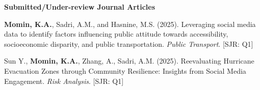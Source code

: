 \documentclass[a4paper,11pt]{article}
\begin{document}
\vspace{-4mm}
\textcolor{mycolor}{\textbf{Submitted/Under-review Journal Articles}}
\begin{enumerate}[leftmargin=*, labelsep=0em, align=left, widest={[\textbf{S.10}]}, itemindent=0em, label={\textbf{[S.\arabic*]}}]

\begin{justifying}

\item \textbf{Momin, K.A.}, Sadri, A.M., and Hasnine, M.S. (2025). Leveraging social media data to identify factors influencing public attitude towards accessibility, socioeconomic disparity, and public transportation. \textit{Public Transport}. \hfill [\textcolor{mycolor}{SJR: Q1}]

\item Sun Y., \textbf{Momin, K.A.}, Zhang, A., Sadri, A.M. (2025). Reevaluating Hurricane Evacuation Zones through Community Resilience: Insights from Social Media Engagement. \textit{Risk Analysis}. \hfill [\textcolor{mycolor}{SJR: Q1}]

\end{justifying}
\end{enumerate}
\end{document}
